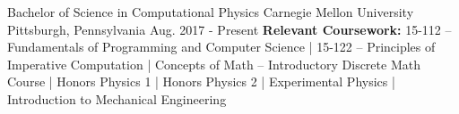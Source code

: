 \begin{cventries}
  \cventry
    {Bachelor of Science in Computational Physics}
    {Carnegie Mellon University}
    {Pittsburgh, Pennsylvania}
    {Aug. 2017 - Present}
    {\textbf{Relevant Coursework:} 15-112 -- Fundamentals of Programming and Computer Science | 15-122 -- Principles of Imperative Computation | Concepts of Math -- Introductory Discrete Math Course | Honors Physics 1 | Honors Physics 2 | Experimental Physics | Introduction to Mechanical Engineering }
    {
    }
\end{cventries}

